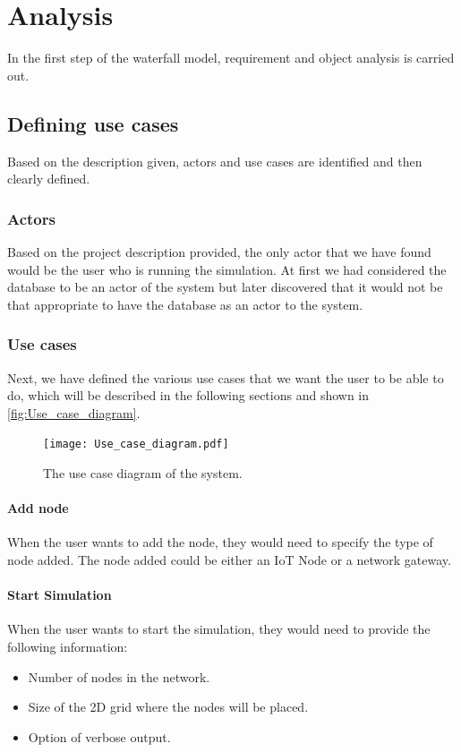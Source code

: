 \chapter{Analysis}\label{ch:Analysis}

In the first step of the waterfall model, requirement and object analysis is carried out.

\section{Defining use cases}
Based on the description given, actors and use cases are identified and then clearly defined.

\subsection{Actors}
Based on the project description provided, the only actor that we have found would be the user who is running the simulation. At first we had considered the database to be an actor of the system but later discovered that it would not be that appropriate to have the database as an actor to the system.

\subsection{Use cases}
Next, we have defined the various use cases that we want the user to be able to do, which will be described in the following sections and shown in \autoref{fig:Use_case_diagram}.

\begin{figure}[h]
  \centering
  \texttt{[image: Use\_case\_diagram.pdf]}
  \caption{The use case diagram of the system.}
  \label{fig:Use_case_diagram}
\end{figure}


\subsubsection{Add node}
When the user wants to add the node, they would need to specify the type of node added. The node added could be either an IoT Node or a network gateway.

\subsubsection{Start Simulation}
When the user wants to start the simulation, they would need to provide the following information:
\begin{itemize}
  \item Number of nodes in the network.
  \item Size of the 2D grid where the nodes will be placed.
  \item Option of verbose output.
\end{itemize}

